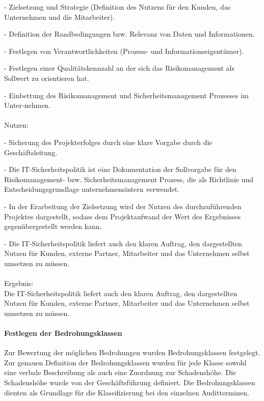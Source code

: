 - Zielsetzung und Strategie (Definition des Nutzens für den Kunden, das Unternehmen und die Mitarbeiter).

- Definition der Randbedingungen bzw. Relevanz von Daten und Informationen.

- Festlegen von Verantwortlichkeiten (Prozess- und Informationseigentümer).

- Festlegen einer Qualitätskennzahl an der sich das Risikomanagement als Sollwert zu orientieren hat.

- Einbettung des Risikomanagement und Sicherheitsmanagement Prozesses im Unter-nehmen.
\\
\\
Nutzen:

- Sicherung des Projekterfolges durch eine klare Vorgabe durch die Geschäftsleitung.

- Die IT-Sicherheitspolitik ist eine Dokumentation der Sollvorgabe für den Risikomanagement- bzw. Sicherheitsmanagement Prozess, die als Richtlinie und Entscheidungsgrundlage unternehmensintern verwendet.

- In der Erarbeitung der Zielsetzung wird der Nutzen des durchzuführenden Projektes dargestellt, sodass dem Projektaufwand der Wert des Ergebnisses gegenübergestellt werden kann.

- Die IT-Sicherheitspolitik liefert auch den klaren Auftrag, den dargestellten Nutzen für Kunden, externe Partner, Mitarbeiter und das Unternehmen selbst umsetzen zu müssen.
\\
\\
Ergebnis:\\
Die IT-Sicherheitspolitik liefert auch den klaren Auftrag, den dargestellten Nutzen für Kunden, externe Partner, Mitarbeiter und das Unternehmen selbst umsetzen zu müssen.

\paragraph {Festlegen der Bedrohungsklassen}
Zur Bewertung der möglichen Bedrohungen wurden Bedrohungsklassen festgelegt. Zur genauen Definition der Bedrohungsklassen wurden für jede Klasse sowohl eine verbale Beschreibung als auch eine Zuordnung zur Schadenshöhe. Die Schadenshöhe wurde von der Geschäftsführung definiert. Die Bedrohungsklassen dienten als Grundlage für die Klassifizierung bei den einzelnen Auditterminen.
